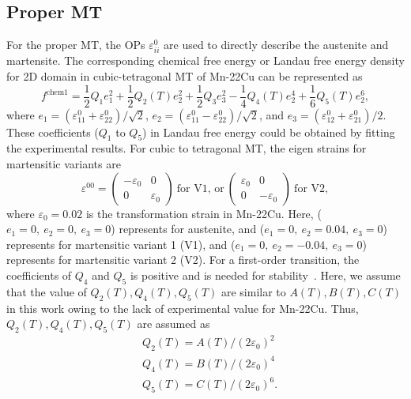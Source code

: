 \documentclass[reprint,3p,sort&compress,times,onecolumn]{elsarticle}
\begin{document}
\subsection{Proper MT}
For the proper MT, the OPs $\varepsilon_{ii}^0$ are used to directly describe the austenite and martensite. The corresponding chemical free energy or Landau free energy density for 2D domain in cubic-tetragonal MT of Mn-22Cu can be represented as~\cite{Dhote2012Dynamic}
\begin{equation}
f^{\text{chem1}}= \frac{1}{2}Q_1e_1^2+\frac{1}{2}Q_2(T)e_2^2+\frac{1}{2}Q_3e_3^2-\frac{1}{4}Q_4(T)e_2^4 + \frac{1}{6}Q_5(T)e_2^6, \label{eq-chem-eps-1}
\end{equation}
where $e_1=(\varepsilon_{11}^0+\varepsilon_{22}^0)/\sqrt{2}$, $e_2=(\varepsilon_{11}^0-\varepsilon_{22}^0)/\sqrt{2}$, and $e_3=(\varepsilon_{12}^0+\varepsilon_{21}^0)/2$. These coefficients ($Q_1$ to $Q_5$) in Landau free energy could be obtained by fitting the experimental results. For cubic to tetragonal MT, the eigen strains for martensitic variants are
\begin{equation}
\varepsilon^{00}=\left(
\begin{array}{cc}
   -\varepsilon_0 &         0 \\
         0&    \varepsilon_0  
\end{array}
\right) ~\text{for V1, or}~
\left(
\begin{array}{cc}
   \varepsilon_0 &         0 \\
         0&    -\varepsilon_0  
\end{array}
\right)~\text{for V2},
\end{equation}
where $\varepsilon_0=0.02$ is the transformation strain in Mn-22Cu. Here, ($e_1=0, ~e_2=0, ~e_3=0$) represents for austenite, and ($e_1=0, ~e_2=0.04,~ e_3=0$) represents for martensitic variant 1 (V1), and ($e_1=0, ~e_2=-0.04,~ e_3=0$) represents for martensitic variant 2 (V2). For a first-order transition, the coefficients of $Q_4$ and $Q_5$ is positive and is needed for stability~\cite{jacobs2003simulations}. Here, we assume that the value of $Q_2(T),Q_4(T),Q_5(T)$ are similar to $A(T),B(T),C(T)$ in this work owing to the lack of experimental value for Mn-22Cu.
Thus, $Q_2(T),Q_4(T),Q_5(T)$ are assumed as
\begin{equation}
\begin{split}
&Q_2(T)=A(T)/(2 \varepsilon_0)^2 \\
&Q_4(T)=B(T)/(2 \varepsilon_0)^4 \\
&Q_5(T)=C(T)/(2 \varepsilon_0)^6 .
\end{split}
\end{equation}
\end{document}
